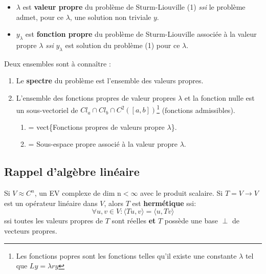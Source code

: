 \documentclass[11pt, a4paper, openany]{book}
\begin{document}
		\begin{itemize}
			\item $\lambda$ est \textbf{valeur propre} du problème de Sturm-Liouville  (1) \textit{ssi} le problème admet, pour ce $\lambda$, une solution non triviale $y$.
			\item $y_\lambda$ est \textbf{fonction propre} du problème de Sturm-Liouville associée à la valeur propre $\lambda$ \textit{ssi} $y_\lambda$ est solution du problème (1) pour ce $\lambda$.
		\end{itemize}
		Deux ensembles sont à connaître :
		\begin{enumerate}
			\item Le \textbf{spectre} du problème est l'ensemble des valeurs propres. 
			\item L'ensemble des fonctions propres de valeur propres $\lambda$ et la fonction nulle est un sous-vectoriel de $Cl_a\cap Cl_b \cap C^2([a,b])$\footnote{Les fonctions popres sont les fonctions telles qu'il existe une constante $\lambda$ tel que $Ly = \lambda r y$} (fonctions admissibles).\begin{enumerate}
			\item = vect\{Fonctions propres de valeurs propre $\lambda$\}.
			\item = Sous-espace propre associé à la valeur propre $\lambda$.
		\end{enumerate}
		\end{enumerate}
													
		\subsection{Rappel d'algèbre linéaire}
		Si $V \approx C^n$, un EV complexe de dim n$< \infty$ avec le produit scalaire. Si $T = V \rightarrow V$ est un opérateur linéaire dans $V$, alors $T$ est \textbf{hermétique} ssi:
		\begin{equation}
			\forall u,v \in V : \langle Tu,v \rangle = \langle u,Tv\rangle
		\end{equation}
		ssi toutes les valeurs propres de $T$ sont réelles \textbf{et} $T$ possède une base $\perp$ de vecteurs propres.
													
													
\end{document}
